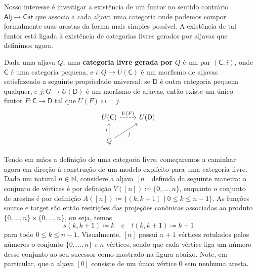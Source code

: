 Nosso interesse é investigar a existência de um funtor no sentido contrário $\mathsf{Alj} \to \mathsf{Cat}$ que associa a cada aljava uma categoria onde podemos compor formalmente suas arestas da forma mais simples possível.
A existência de tal funtor está ligada à existência de categorias livres gerados por aljavas que definimos agora.

\begin{defin}\label{defin:categoria_livre}
    Dada uma aljava $Q$, uma \textbf{categoria livre gerada por $Q$} é um par $(\mathsf{C},i)$, onde $\mathsf{C}$ é uma categoria pequena, e $i: Q \to U(\mathsf{C})$ é um morfismo de aljavas satisfazendo a seguinte propriedade universal: se $\mathsf{D}$ é outra categoria pequena qualquer, e $j: G \to U(\mathsf{D})$ é um morfismo de aljavas, então existe um único funtor $F: \mathsf{C} \to \mathsf{D}$ tal que $U(F) \circ i = j$.
    \begin{displaymath}
        \begin{tikzcd}
            U(\mathsf{C})
            \arrow[r, dashed, "U(F)"]
            & U(\mathsf{D})
            \\ Q
            \arrow[u, "i"]
            \arrow[ru, "j" swap]
        \end{tikzcd}
    \end{displaymath}
\end{defin}

Tendo em mãos a definição de uma categoria livre, começaremos a caminhar agora em direção à construção de um modelo explícito para uma categoria livre.
Dado um natural $n \in \mathbb{N}$, considere a aljava $[n]$ definida da seguinte maneira: o conjunto de vértices é por definição $V([n]) \coloneqq \{0,\dots,n\}$, enquanto o conjunto de arestas é por definição $A([n]) \coloneqq \{(k,k+1) \mid 0 \leq k \leq n-1\}$.
As funções source e target são então restrições das projeções canônicas associadas ao produto $\{0,\dots,n\} \times \{0,\dots,n\}$, ou seja, temos
\begin{displaymath}
    s(k,k+1) \coloneqq k
    \quad \text{e} \quad
    t(k,k+1) \coloneqq k+1
\end{displaymath}
para todo $0 \leq k \leq n-1$.
Visualmente, $[n]$ possui $n+1$ vértices rotulados pelos números o conjunto $\{0,\dots,n\}$ e $n$ vértices, sendo que cada vértice liga um número desse conjunto ao seu sucessor como mostrado na figura abaixo.
Note, em particular, que a aljava $[0]$ consiste de um único vértice $0$ sem nenhuma aresta.

